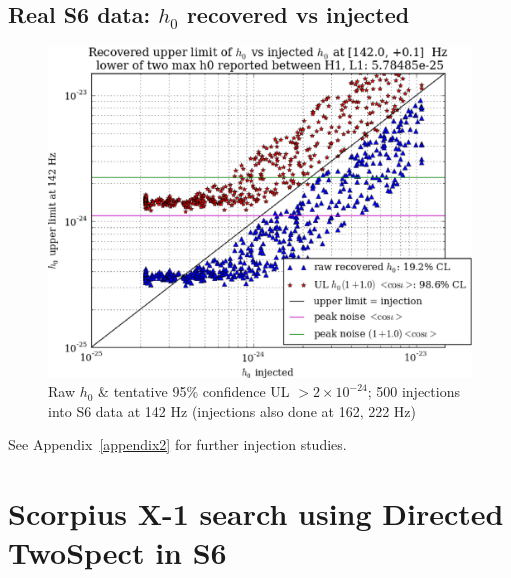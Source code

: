         \subsection{Real S6 data: $h_0$ recovered vs injected}

\begin{figure}
\begin{center}
\includegraphics[width=0.5\paperwidth,height=0.35\paperheight]{plots/h0UL-vs-h0injected-142-0Hz.eps}
\caption{
Raw $h_0$ \& tentative 95\% confidence UL $>2\times10^{-24}$; 500 injections
into S6 data at 142 Hz (injections also done at 162, 222 Hz)}
\label{S6_ULs_142}
\end{center}
\end{figure}

See Appendix~\ref{appendix2} for further injection studies.




        \section{Scorpius X-1 search using Directed TwoSpect in S6}
        \label{directed_results}
 




